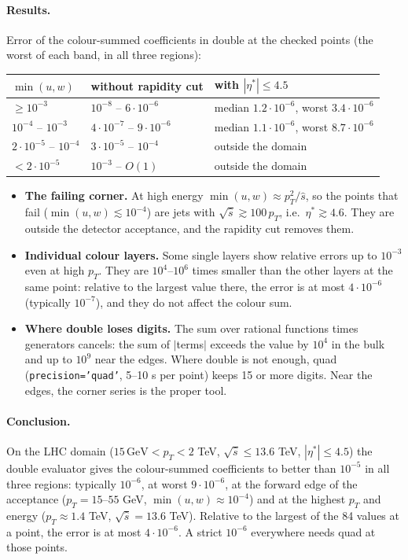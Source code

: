 \documentclass[11pt]{article}
\begin{document}
\paragraph{Results.} Error of the colour-summed coefficients in double at the checked points (the worst of each band,
in all three regions):
\begin{center}
\begin{tabular}{lll}
\toprule
$\min(u,w)$ & without rapidity cut & with $|\eta^*|\le4.5$ \\
\midrule
$\ge10^{-3}$ & $10^{-8}$ -- $6\cdot10^{-6}$ & median $1.2\cdot10^{-6}$, worst $3.4\cdot10^{-6}$ \\
$10^{-4}$ -- $10^{-3}$ & $4\cdot10^{-7}$ -- $9\cdot10^{-6}$ & median $1.1\cdot10^{-6}$, worst $8.7\cdot10^{-6}$ \\
$2\cdot10^{-5}$ -- $10^{-4}$ & $3\cdot10^{-5}$ -- $10^{-4}$ & outside the domain \\
$<2\cdot10^{-5}$ & $10^{-3}$ -- $O(1)$ & outside the domain \\
\bottomrule
\end{tabular}
\end{center}
\begin{itemize}
\item \textbf{The failing corner.} At high energy $\min(u,w)\approx p_T^2/\hat s$, so the points that fail ($\min(u,w)
  \lesssim10^{-4}$) are jets with $\sqrt{\hat s}\gtrsim100\,p_T$, i.e.\ $\eta^*\gtrsim4.6$. They are outside the detector
  acceptance, and the rapidity cut removes them.
\item \textbf{Individual colour layers.} Some single layers show relative errors up to $10^{-3}$ even at high $p_T$. They
  are $10^4$--$10^6$ times smaller than the other layers at the same point: relative to the largest value there, the
  error is at most $4\cdot10^{-6}$ (typically $10^{-7}$), and they do not affect the colour sum.
\item \textbf{Where double loses digits.} The sum over rational functions times generators cancels: the sum of
  $|$terms$|$ exceeds the value by $10^4$ in the bulk and up to $10^9$ near the edges. Where double is not enough, quad
  (\texttt{precision='quad'}, 5--10 s per point) keeps 15 or more digits. Near the edges, the corner series is the
  proper tool.
\end{itemize}

\paragraph{Conclusion.} On the LHC domain ($15\,\text{GeV}<p_T<2$ TeV, $\sqrt{\hat s}\le13.6$ TeV, $|\eta^*|\le4.5$) the
double evaluator gives the colour-summed coefficients to better than $10^{-5}$ in all three regions: typically
$10^{-6}$, at worst $9\cdot10^{-6}$, at the forward edge of the acceptance ($p_T=15$--$55$ GeV, $\min(u,w)\approx10^{-4}$)
and at the highest $p_T$ and energy ($p_T\approx1.4$ TeV, $\sqrt{\hat s}=13.6$ TeV). Relative to the largest of the 84
values at a point, the error is at most $4\cdot10^{-6}$. A strict $10^{-6}$ everywhere needs quad at those points.
\end{document}
